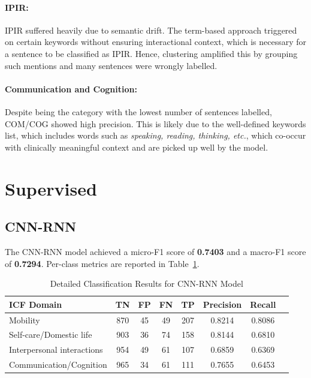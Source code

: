 \paragraph{IPIR:} IPIR suffered heavily due to semantic drift. The term-based approach triggered on certain keywords without ensuring interactional context, which is necessary for a sentence to be classified as IPIR. Hence, clustering amplified this by grouping such mentions and many sentences were wrongly labelled.

\paragraph{Communication and Cognition:} Despite being the category with the lowest number of sentences labelled, COM/COG showed high precision. This is likely due to the well-defined keywords list, which includes words such as \textit{speaking, reading, thinking, etc.}, which co-occur with clinically meaningful context and are picked up well by the model.

\section{Supervised}

\subsection{CNN-RNN}

The CNN-RNN model achieved a micro-F1 score of \textbf{0.7403} and a macro-F1 score of \textbf{0.7294}. Per-class metrics are reported in Table~\ref{tab:supervised-results}.

\begin{table}[H]
\centering
\caption{Detailed Classification Results for CNN-RNN Model}
\label{tab:supervised-results}
\begin{tabular}{lccccccc}
\toprule
\textbf{ICF Domain} & \textbf{TN} & \textbf{FP} & \textbf{FN} & \textbf{TP} & \textbf{Precision} & \textbf{Recall} \\ 
\midrule
Mobility & 870 & 45 & 49 & 207 & 0.8214 & 0.8086\\[0.5ex]
Self-care/Domestic life & 903 & 36 & 74 & 158 & 0.8144 & 0.6810\\[0.5ex]
Interpersonal interactions & 954 & 49 & 61 & 107 & 0.6859 & 0.6369\\[0.5ex]
Communication/Cognition & 965 & 34 & 61 & 111 & 0.7655 & 0.6453\\ 
\bottomrule
\end{tabular}
\end{table}

